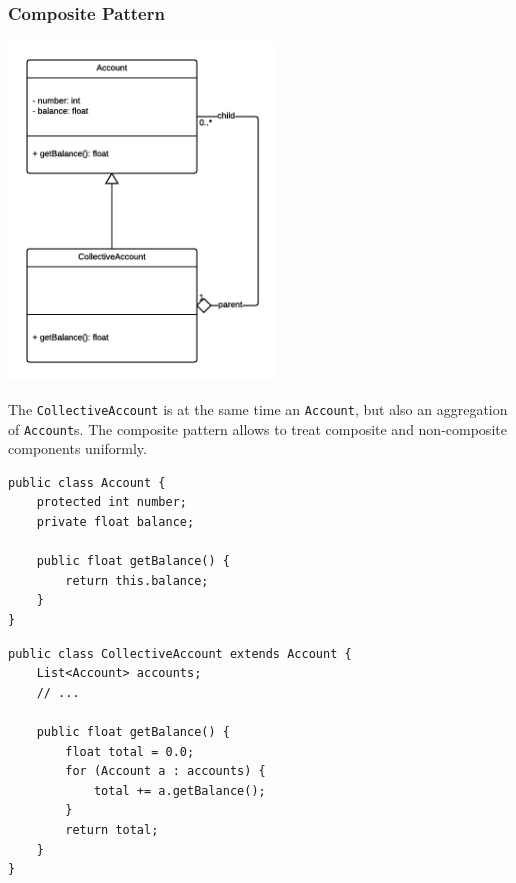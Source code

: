 \documentclass[11pt, a4paper]{article}
\newcommand{\settextlisting}{\lstset{ basicstyle=\small\ttfamily }}
\newcommand{\setcodelisting}{\lstset{ basicstyle=\footnotesize\ttfamily }}
\begin{document}
\subsubsection{Composite Pattern}

\centerline{\includegraphics[height=9cm]{CompositePattern.png}}

\settextlisting
The \lstinline|CollectiveAccount| is at the same time an \lstinline|Account|, but also an aggregation of \lstinline|Account|s.
The composite pattern allows to treat composite and non-composite components uniformly.

\bigskip
\setcodelisting
\begin{lstlisting}
public class Account {
	protected int number;
	private float balance;
	
	public float getBalance() {
		return this.balance;
	}
}
\end{lstlisting}


\begin{lstlisting}
public class CollectiveAccount extends Account {
	List<Account> accounts;
	// ...
	
	public float getBalance() {
		float total = 0.0;
		for (Account a : accounts) {
			total += a.getBalance();
		}
		return total;
	}
}
\end{lstlisting}
\end{document}
